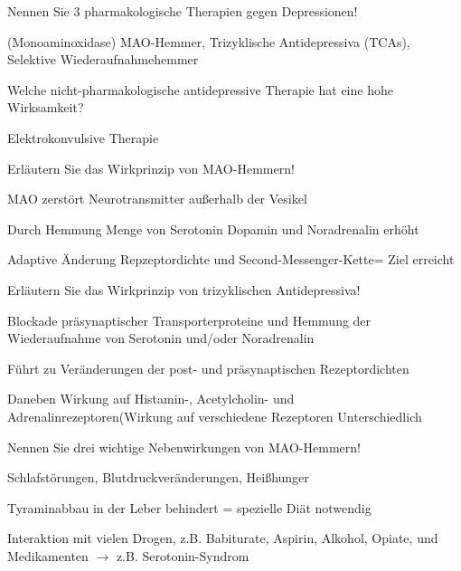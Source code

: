 \documentclass[10pt, a4paper]{exam}
\begin{document}
\begin{questions}
  \question Nennen Sie 3 pharmakologische Therapien gegen Depressionen!
  \begin{solution}
    (Monoaminoxidase) MAO-Hemmer, Trizyklische Antidepressiva (TCAs), Selektive Wiederaufnahmehemmer
  \end{solution}

  \question Welche nicht-pharmakologische antidepressive Therapie hat eine hohe Wirksamkeit?
  \begin{solution}
    Elektrokonvulsive Therapie
  \end{solution}

  \question Erläutern Sie das Wirkprinzip von MAO-Hemmern!
  \begin{solution}
    \begin{itemize*}
      \item MAO zerstört Neurotransmitter außerhalb der Vesikel
      \item Durch Hemmung Menge von Serotonin Dopamin und Noradrenalin erhöht
      \item Adaptive Änderung Repzeptordichte und Second-Messenger-Kette= Ziel erreicht
    \end{itemize*}
  \end{solution}

  \question Erläutern Sie das Wirkprinzip von trizyklischen Antidepressiva!
  \begin{solution}
    \begin{itemize*}
      \item Blockade präsynaptischer Transporterproteine und Hemmung der Wiederaufnahme von Serotonin und/oder Noradrenalin
      \item Führt zu Veränderungen der post- und präsynaptischen Rezeptordichten
      \item Daneben Wirkung auf Histamin-, Acetylcholin- und Adrenalinrezeptoren(Wirkung auf verschiedene Rezeptoren Unterschiedlich
    \end{itemize*}
  \end{solution}

  \question Nennen Sie drei wichtige Nebenwirkungen von MAO-Hemmern!
  \begin{solution}
    \begin{itemize*}
      \item Schlafstörungen, Blutdruckveränderungen, Heißhunger
      \item Tyraminabbau in der Leber behindert = spezielle Diät notwendig
      \item Interaktion mit vielen Drogen, z.B. Babiturate, Aspirin, Alkohol, Opiate, und Medikamenten $\rightarrow$ z.B. Serotonin-Syndrom
    \end{itemize*}
  \end{solution}


\end{questions}
\end{document}
